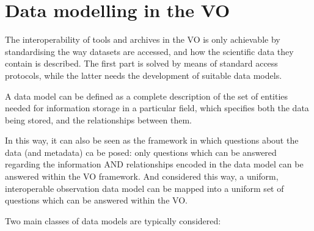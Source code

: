 \chapter{Data modelling in the VO} %
\label{cha:data_modelling_in_the_vo}

% 
% 
% 
	
	
	The interoperability of tools and archives in the VO is only
	achievable by standardising the way datasets are accessed, and
	how the scientific data they contain is described. The first
	part is solved by means of standard access protocols, while the
	latter needs the development of suitable data models.
	
	 A data model can be defined as a complete description of the
	set of entities needed for information storage in a particular
	field, which specifies both the data being stored, and the
	relationships between them.
	
	 In this way, it can also be seen as the framework in which
	questions about the data (and metadata) ca be posed: only
	questions which can be answered regarding the information AND
	relationships encoded in the data model can be answered within
	the VO framework. And considered this way, a uniform,
	interoperable observation data model can be mapped into
	a uniform set of questions which can be answered within the VO.
	
	 Two main classes of data models are typically considered:
	
